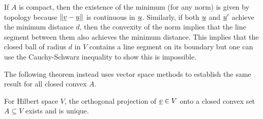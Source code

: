 \begin{remark}
If $A$ is compact, then the existence of the minimum (for any norm) is given by topology because $\| \underline{v} - \underline{u} \|$ is continuous in $\underline{u}$.
Similarly, if both $\underline{u}$ and $\underline{u}'$ achieve the minimum distance $d$, then the convexity of the norm implies that the line segment between them also achieves the minimum distance. 
This implies that the closed ball of radius $d$ in $V$ contains a line segment on its boundary but one can use the Cauchy-Schwarz inequality to show this is impossible.
\end{remark}

The following theorem instead uses vector space methods to establish the same result for all closed convex $A$.

\begin{theorem}
\label{theorem:HilbertProjectionTheorem} For Hilbert space $V$, the orthogonal projection of $\underline v \in V$ onto a closed convex set $A\subseteq V$ exists and is unique.
\end{theorem}
